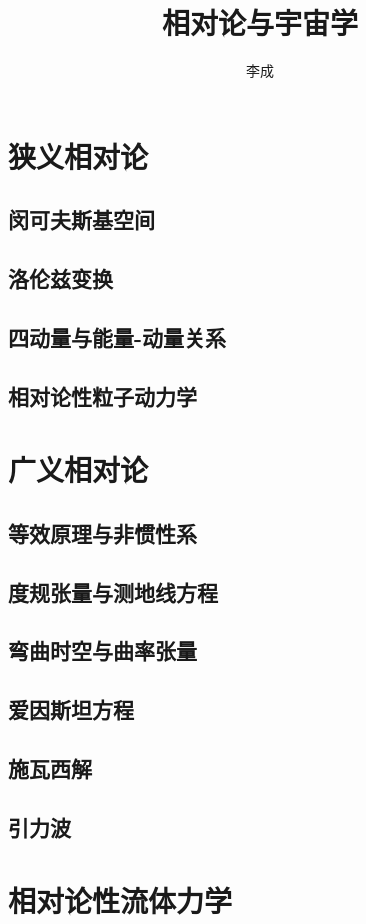 \documentclass[a4paper]{report}
\author{李成}
\title{\textbf{{\Huge 相对论与宇宙学}}}
\begin{document}
\maketitle
\tableofcontents


\chapter{狭义相对论}
\section{闵可夫斯基空间}
\section{洛伦兹变换}
\section{四动量与能量-动量关系}
\section{相对论性粒子动力学}

\chapter{广义相对论}
\section{等效原理与非惯性系}
\section{度规张量与测地线方程}
\section{弯曲时空与曲率张量}
\section{爱因斯坦方程}
\section{施瓦西解}
\section{引力波}

\chapter{相对论性流体力学}
\end{document}
